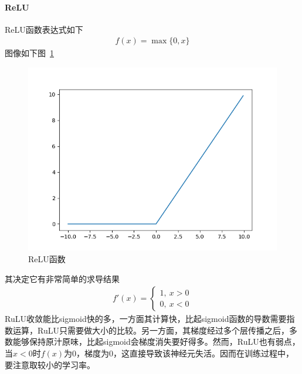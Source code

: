 \paragraph{ReLU}
ReLU函数表达式如下
\begin{eqnarray}
f(x)=\max\{0,x\}
\end{eqnarray}
图像如下图~\ref{fig:bp4}
\begin{figure}[htb]
\centering
\includegraphics[scale=0.5]{../figures/NN5.png} 
\caption{ReLU函数}
\label{fig:bp4}
\end{figure}
其决定它有非常简单的求导结果
\begin{eqnarray}
f'(x)=
\left\lbrace
\begin{aligned}
1,\ x>0\\
0,\ x<0
\end{aligned}
\right.
\end{eqnarray}
RuLU收敛能比sigmoid快的多，一方面其计算快，比起sigmoid函数的导数需要指数运算，RuLU只需要做大小的比较。另一方面，其梯度经过多个层传播之后，多数能够保持原汁原味，比起sigmoid会梯度消失要好得多。然而，RuLU也有弱点，当$x<0$时$f(x)$为0，梯度为0，这直接导致该神经元失活。因而在训练过程中，要注意取较小的学习率。
